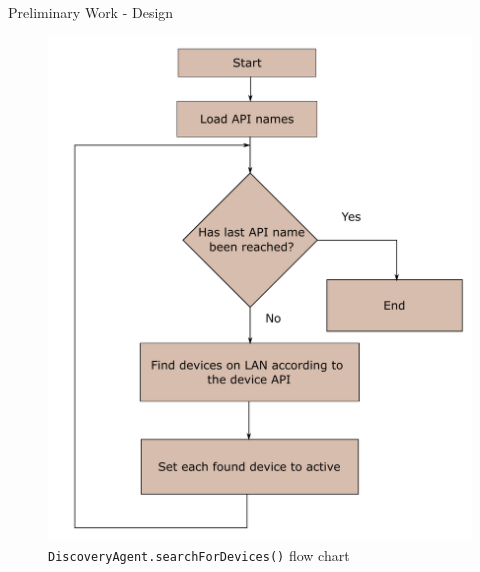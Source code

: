 \documentclass{beamer}
\begin{document}
\begin{frame}{Preliminary Work - Design}{}
    \begin{figure}
        \centering
        \includegraphics[scale=0.3]{figs/agents/searchForDevicesFlow.pdf}
        \caption{\texttt{DiscoveryAgent.searchForDevices()} flow chart}
        \label{fig:searchForDevicesFlow}
    \end{figure}
\end{frame}
\end{document}
